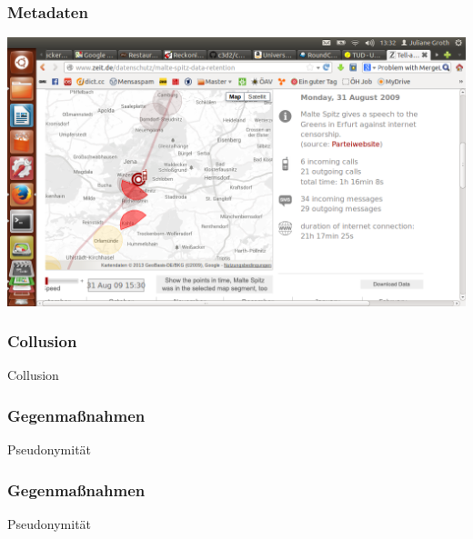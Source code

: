 \documentclass[12pt]{beamer}
\begin{document}
\begin{frame}
    \frametitle{Metadaten}
    \includegraphics[height=0.7\textheight]{img/maltespitz.png}
\end{frame}

\begin{frame}
    \frametitle{Collusion}
    \begin{center} \Large Collusion \end{center}
\end{frame}

\begin{frame}
    \frametitle{Gegenmaßnahmen}
    \begin{center} \Large Pseudonymität \end{center}
\end{frame}

\begin{frame}
    \frametitle{Gegenmaßnahmen}
    \begin{center} \Large Pseudonymität \end{center}
\end{frame}
\end{document}
